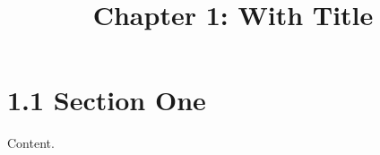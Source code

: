\documentclass{article}
\title{Chapter 1: With Title}
\begin{document}
\section{1.1 Section One}
Content.
\end{document}
